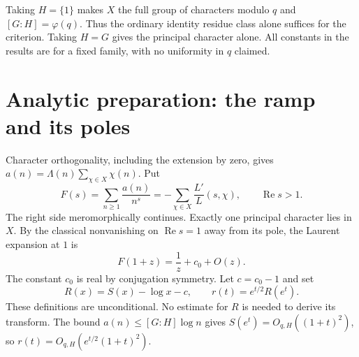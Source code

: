 \documentclass[11pt]{article}
\theoremstyle{remark}\newtheorem{remark}[theorem]{Remark}
\newcommand{\Rea}{\operatorname{Re}}
\begin{document}
Taking $H=\{1\}$ makes $X$ the full group of characters modulo $q$ and $[G:H]=\varphi(q)$. Thus the ordinary identity residue class alone suffices for the criterion. Taking $H=G$ gives the principal character alone. All constants in the results are for a fixed family, with no uniformity in $q$ claimed.

\section{Analytic preparation: the ramp and its poles}
Character orthogonality, including the extension by zero, gives $a(n)=\Lambda(n)\sum_{\chi\in X}\chi(n)$. Put
\begin{equation}\label{eq:F}
 F(s)=\sum_{n\ge1}\frac{a(n)}{n^s}=-\sum_{\chi\in X}\frac{L'}{L}(s,\chi),\qquad \Rea s>1.
\end{equation}
The right side meromorphically continues. Exactly one principal character lies in $X$. By the classical nonvanishing on $\Rea s=1$ away from its pole, the Laurent expansion at $1$ is
\[
 F(1+z)=\frac1z+c_0+O(z).
\]
The constant $c_0$ is real by conjugation symmetry. Let $c=c_0-1$ and set
\begin{equation}\label{eq:R}
 R(x)=S(x)-\log x-c,\qquad r(t)=e^{t/2}R(e^t).
\end{equation}
These definitions are unconditional. No estimate for $R$ is needed to derive its transform. The bound $a(n)\le [G:H]\log n$ gives $S(e^t)=O_{q,H}((1+t)^2)$, so $r(t)=O_{q,H}(e^{t/2}(1+t)^2)$.
\end{document}

